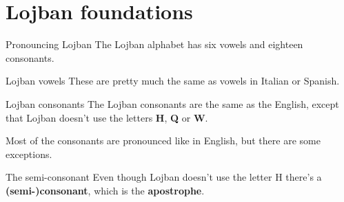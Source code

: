 \section{Lojban foundations}
\begin{frame}{Pronouncing Lojban}
    The Lojban alphabet has six vowels and eighteen consonants.
\end{frame}

\begin{frame}{Lojban vowels}
    These are pretty much the same as vowels in Italian or Spanish.
\end{frame}

\begin{frame}{Lojban consonants}
    The Lojban consonants are the same as the English, except that Lojban doesn't use the letters \textbf{H}, \textbf{Q} or \textbf{W}.

    Most of the consonants are pronounced like in English, but there are some exceptions.

\end{frame}

\begin{frame}{The semi-consonant}
    Even though Lojban doesn't use the letter H there's a \textbf{(semi-)consonant}, which is the \textbf{apostrophe}.


\end{frame}

